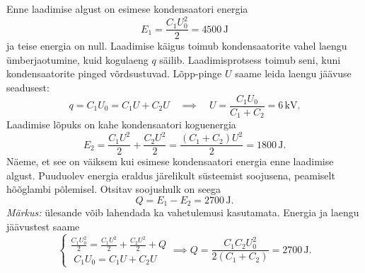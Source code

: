 \solu
Enne laadimise algust on esimese kondensaatori energia
\[E_1=\frac{C_1U_0^2}{2}=4500\,\textrm{J}\]
ja teise energia on null. Laadimise käigus toimub kondensaatorite vahel laengu ümberjaotumine, kuid kogulaeng $q$ säilib. Laadimisprotsess toimub seni, kuni kondensaatorite pinged võrdsustuvad. Lõpp-pinge $U$ saame leida laengu jäävuse seadusest:
\[q=C_1U_0=C_1U+C_2U\quad\implies\quad U=\frac{C_1U_0}{C_1+C_2}=6\,\textrm{kV}.\]
Laadimise lõpuks on kahe kondensaatori koguenergia
\[E_2=\frac{C_1U^2}{2}+\frac{C_2U^2}{2}=\frac{(C_1+C_2)U^2}{2}=1800\,\textrm{J}.\]
Näeme, et see on väiksem kui esimese kondensaatori energia enne laadimise algust. Puuduolev energia eraldus järelikult süsteemist soojusena, peamiselt hõõglambi põlemisel. Otsitav soojushulk on seega
\[Q=E_1-E_2=2700\,\textrm{J}.\]
\emph{Märkus:} ülesande võib lahendada ka vahetulemusi kasutamata. Energia ja laengu jäävustest saame
\[
\begin{cases}
\displaystyle\frac{C_1U_0^2}{2}=\frac{C_1U^2}{2}+\frac{C_2U^2}{2}+Q\\
\,\,C_1U_0=C_1U+C_2U
\end{cases}
\implies Q=\frac{C_1C_2U_0^2}{2(C_1+C_2)}=2700\,\textrm{J}.
\]
\probend